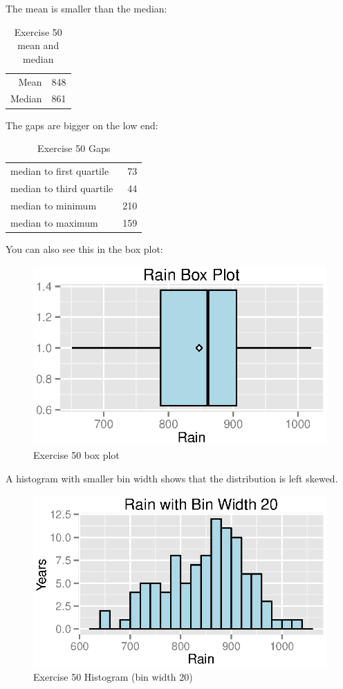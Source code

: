 \documentclass{exam}
\begin{document}
  The mean is smaller than the median:
  \begin{table}[H]
    \centering
    \begin{tabular}{rr}
      \toprule
      Mean    & 848 \\
      Median  & 861 \\
      \bottomrule
    \end{tabular}
    \caption{Exercise 50 mean and median}
  \end{table}

  The gaps are bigger on the low end:
  \begin{table}[H]
    \centering
    \begin{tabular}{lr}
      \toprule
      median to first quartile & 73 \\
      median to third quartile & 44 \\
      \midrule
      median to minimum & 210 \\
      median to maximum & 159 \\
      \bottomrule
    \end{tabular}
    \caption{Exercise 50 Gaps}
  \end{table}

  You can also see this in the box plot:
  \begin{figure}[H]
    \centering
    \includegraphics{figures/ex50_box.eps}
    \caption{Exercise 50 box plot}
  \end{figure}

  A histogram with smaller bin width shows that the distribution is left skewed.
  \begin{figure}[H]
    \centering
    \includegraphics{figures/ex50_histogram_20.eps}
    \caption{Exercise 50 Histogram (bin width 20)}
  \end{figure}
\end{document}
